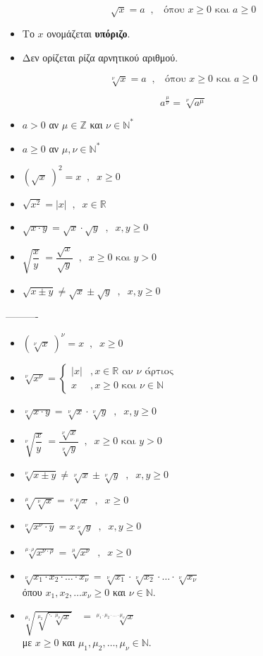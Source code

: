 \documentclass[11pt]{article}
\begin{document}
\[ \sqrt{x}=a\;\;,\;\;\textrm{ όπου }x\geq0\textrm{ και }a\geq0 \]
\begin{itemize}[itemsep=0mm]
\item Το $ x $ ονομάζεται \textbf{υπόριζο}.
\item Δεν ορίζεται ρίζα αρνητικού αριθμού.
\end{itemize}
\[ \sqrt[\nu]{x}=a\;\;,\;\;\textrm{ όπου }x\geq0\textrm{ και }a\geq0 \]

\[ a^{\frac{\mu}{\nu}}=\!\sqrt[\nu]{a^\mu} \]
\begin{itemize}
\item $a>0$ αν $\mu\in\mathbb{Z}$ και $\nu\in\mathbb{N}^*$
\item $a\geq 0$ αν $\mu,\nu\in\mathbb{N}^*$
\end{itemize}
\begin{itemize}[label*=\faEdit]
\item $ \left(\sqrt{x}\;\right)^2=x\;\;,\;\; x\geq0  $
\item  $ \sqrt{x^2}=|x|\;\;,\;\; x\in\mathbb{R} $
\item $ \sqrt{x\cdot y}=\!\sqrt{x}\cdot\!\sqrt{y}\;\;,\;\; x,y\geq0 $
\item $ \sqrt{\dfrac{x}{y}}\;=\dfrac{\sqrt{x}}{\sqrt{y}}\;\;,\;\; x\geq0\textrm{ και }y>0 $
\item $ \sqrt{x\pm y}\neq\!\sqrt{x}\pm\!\sqrt{y}\;\;,\;\; x,y\geq0 $
\end{itemize}
----------
\begin{itemize}[label*=\faEdit]
\item $ \left(\sqrt[\nu]{x}\;\right)^\nu=x\;\;,\;\; x\geq0  $ 
\item $ \sqrt[\nu]{x^\nu}=\begin{cases}
|x|&  ,x\in\mathbb{R}\textrm{ αν }\nu\textrm{ άρτιος}\\x&  ,x\geq0\textrm{ και } \nu\in\mathbb{N}\end{cases} $
\item $ \sqrt[\nu]{x\cdot y}=\!\sqrt[\nu]{x}\cdot\!\sqrt[\nu]{y}\;\;,\;\; x,y\geq0 $ 
\item $ \sqrt[\nu]{\dfrac{x}{y}}\;=\dfrac{\sqrt[\nu]{x}}{\sqrt[\nu]{y}}\;\;,\;\; x\geq0\textrm{ και }y>0 $
\item $ \sqrt[\nu]{x\pm y}\neq\!\sqrt[\nu]{x}\pm\!\sqrt[\nu]{y}\;\;,\;\; x,y\geq0 $
 \item $ \sqrt[\mu]{\!\sqrt[\nu]{x}}=\!\sqrt[\nu\cdot\mu]{x}\;\;,\;\; x\geq0 $ 
\item $ \sqrt[\nu]{x^\nu\cdot y}=x\!\sqrt[\nu]{y}\;\;,\;\; x,y\geq0  $ 
 \item $ \sqrt[\mu\cdot\rho]{x^{\nu\cdot\rho}}=\!\sqrt[\mu]{x^{\nu}}\;\;,\;\; x\geq0 $ 
\item $ \sqrt[\nu]{x_1\cdot x_2\cdot\ldots\cdot x_\nu}=\!\sqrt[\nu]{x_1}\cdot\!\sqrt[\nu]{x_2}\cdot\ldots\cdot\!\sqrt[\nu]{x_\nu} $\\όπου $ x_1,x_2,\ldots x_\nu\geq0 $ και $ \nu\in\mathbb{N} $.
\item $ \sqrt[\mu_1]{\!\sqrt[\mu_2]{\mbox{}^{\ddots}\sqrt[\mu_{\nu}]{x}}}\;\;\;=\sqrt[\mu_1\cdot\mu_2\cdot\ldots\cdot\mu_\nu]{x}$\\με $ x\geq0 $ και $ \mu_1,\mu_2,\ldots,\mu_\nu\in\mathbb{N} $.
\end{itemize}
\end{document}
